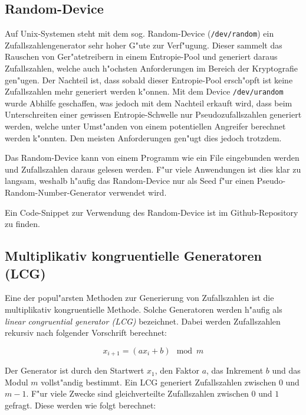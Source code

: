 \begin{refsection}
\subsection{Random-Device} \label{subsec:RandomDev}

Auf Unix-Systemen steht mit dem sog. Random-Device (\texttt{/dev/random})
ein Zufallszahlengenerator sehr hoher G"ute zur Verf"ugung. Dieser
sammelt das Rauschen von Ger"atetreibern in einem Entropie-Pool und
generiert daraus Zufallszahlen, welche auch h"ochsten Anforderungen im
Bereich der Kryptografie gen"ugen. Der Nachteil ist, dass sobald dieser
Entropie-Pool ersch"opft ist keine Zufallszahlen mehr generiert werden
k"onnen. Mit dem Device \texttt{/dev/urandom} wurde Abhilfe geschaffen,
was jedoch mit dem Nachteil erkauft wird, dass beim Unterschreiten einer
gewissen Entropie-Schwelle nur Pseudozufallszahlen generiert werden,
welche unter Umst"anden von einem potentiellen Angreifer berechnet werden
k"onnten. Den meisten Anforderungen gen"ugt dies jedoch trotzdem.

Das Random-Device kann von einem Programm wie ein File eingebunden
werden und Zufallszahlen daraus gelesen werden. F"ur viele Anwendungen
ist dies klar zu langsam, weshalb h"aufig das Random-Device nur als Seed
f"ur einen Pseudo-Random-Number-Generator verwendet wird.

Ein Code-Snippet zur Verwendung des Random-Device ist im Github-Repository
\cite{rng:githubRepo} zu finden.


\subsection{Multiplikativ kongruentielle Generatoren (LCG)} \label{subsec:LCG}
Eine der popul"arsten Methoden zur Generierung von Zufallszahlen ist die
multiplikativ kongruentielle Methode. Solche Generatoren werden h"aufig
als \textit{linear congruential generator (LCG)} bezeichnet. Dabei werden
Zufallszahlen rekursiv nach folgender Vorschrift berechnet:

\begin{equation}
	x_{i+1} = \left( a x_{i} + b \right) \mod{m}
	\label{equ:lcg_equation}
\end{equation}

Der Generator ist durch den Startwert $x_1$, den Faktor $a$,
das Inkrement $b$ und das Modul $m$ vollst"andig bestimmt. Ein LCG
generiert Zufallszahlen zwischen $0$ und $m-1$. F"ur viele Zwecke sind
gleichverteilte Zufallszahlen zwischen $0$ und $1$ gefragt. Diese werden
wie folgt berechnet:


\end{refsection}
